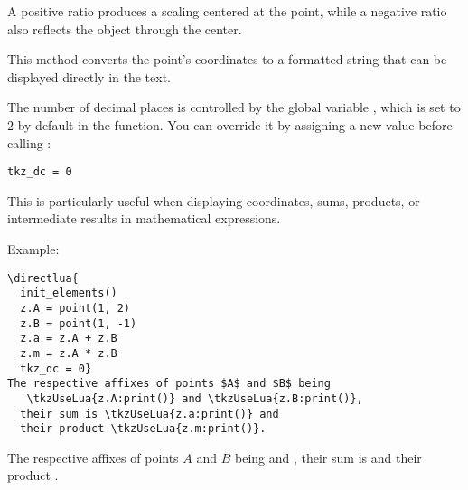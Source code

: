 \noindent
A positive ratio  produces a scaling centered at the point, while a negative ratio also reflects the object through the center.

\vspace{1em}

\begin{tkzexample}[latex=7cm]
\begin{center}
\end{center}
\end{tkzexample}

 This method converts the point’s coordinates to a formatted string that can be displayed directly in the text.

\medskip
\noindent
The number of decimal places is controlled by the global variable , which is set to $2$ by default in the  function. You can override it by assigning a new value before calling :

\begin{verbatim}
tkz_dc = 0
\end{verbatim}

\medskip
\noindent
This is particularly useful when displaying coordinates, sums, products, or intermediate results in mathematical expressions.

\medskip
\noindent
Example:

\begin{verbatim}
\directlua{
  init_elements()
  z.A = point(1, 2)
  z.B = point(1, -1)
  z.a = z.A + z.B
  z.m = z.A * z.B
  tkz_dc = 0}
The respective affixes of points $A$ and $B$ being
   \tkzUseLua{z.A:print()} and \tkzUseLua{z.B:print()},
  their sum is \tkzUseLua{z.a:print()} and
  their product \tkzUseLua{z.m:print()}.
\end{verbatim}


The respective affixes of points $A$ and $B$ being
    and ,
  their sum is  and
  their product .
\endinput